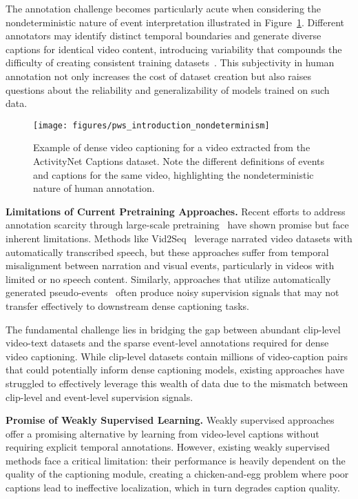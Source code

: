 The annotation challenge becomes particularly acute when considering the nondeterministic nature of event interpretation illustrated in Figure~\ref{fig:nondeterminism}. Different annotators may identify distinct temporal boundaries and generate diverse captions for identical video content, introducing variability that compounds the difficulty of creating consistent training datasets~\cite{Summers2021-mz}. This subjectivity in human annotation not only increases the cost of dataset creation but also raises questions about the reliability and generalizability of models trained on such data.

\begin{figure}[t]
    \centering
    \texttt{[image: figures/pws\_introduction\_nondeterminism]}
    \caption{Example of dense video captioning for a video extracted from the ActivityNet Captions dataset.
        Note the different definitions of events and captions for the same video, highlighting the nondeterministic nature of human annotation.}
    \label{fig:nondeterminism}
\end{figure}

\textbf{Limitations of Current Pretraining Approaches.}
Recent efforts to address annotation scarcity through large-scale pretraining~\cite{Yang2023-fm,Zhang2022-ni,Seo2022-ok} have shown promise but face inherent limitations. Methods like Vid2Seq~\cite{Yang2023-fm} leverage narrated video datasets with automatically transcribed speech, but these approaches suffer from temporal misalignment between narration and visual events, particularly in videos with limited or no speech content. Similarly, approaches that utilize automatically generated pseudo-events~\cite{Zhang2022-ni} often produce noisy supervision signals that may not transfer effectively to downstream dense captioning tasks.

The fundamental challenge lies in bridging the gap between abundant clip-level video-text datasets and the sparse event-level annotations required for dense video captioning. While clip-level datasets contain millions of video-caption pairs that could potentially inform dense captioning models, existing approaches have struggled to effectively leverage this wealth of data due to the mismatch between clip-level and event-level supervision signals.

\textbf{Promise of Weakly Supervised Learning.}
Weakly supervised approaches~\cite{Duan2018-qf,Chen2021-sv,Rahman2019-rp} offer a promising alternative by learning from video-level captions without requiring explicit temporal annotations. However, existing weakly supervised methods face a critical limitation: their performance is heavily dependent on the quality of the captioning module, creating a chicken-and-egg problem where poor captions lead to ineffective localization, which in turn degrades caption quality.

